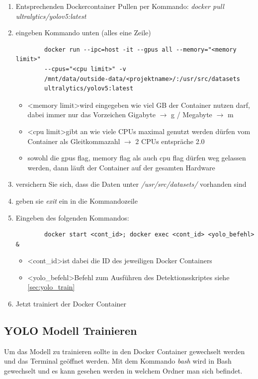 \begin{enumerate}
    \item Entsprechenden Dockercontainer Pullen per Kommando: \textit{docker pull ultralytics/yolov5:latest} 
    \item eingeben Kommando unten (alles eine Zeile)
    \begin{verbatim}
        docker run --ipc=host -it --gpus all --memory="<memory limit>"
        --cpus="<cpu limit>" -v 
        /mnt/data/outside-data/<projektname>/:/usr/src/datasets
        ultralytics/yolov5:latest
    \end{verbatim}
    \begin{itemize}
        \item \textless memory limit\textgreater  wird eingegeben wie viel GB der Container nutzen darf, dabei immer nur das Vorzeichen Gigabyte  $\rightarrow$ g / Megabyte $\rightarrow$ m
        \item \textless cpu limit\textgreater gibt an wie viele CPUs maximal genutzt werden dürfen vom Container als Gleitkommazahl $\rightarrow$ 2 CPUs entspräche 2.0
        \item sowohl die gpus flag, memory flag als auch cpu flag dürfen weg gelassen werden, dann läuft der Container auf der gesamten Hardware    
    \end{itemize}
    \item versichern Sie sich, dass die Daten unter \textit{/usr/src/datasets/} vorhanden sind
    \item geben sie \textit{exit} ein in die Kommandozeile 
    \item Eingeben des folgenden Kommandos:
    \begin{verbatim}
        docker start <cont_id>; docker exec <cont_id> <yolo_befehl> &
    \end{verbatim}
    \begin{itemize}
        \item  \textless cont\_id\textgreater  ist dabei die ID des jeweiligen Docker Containers
        \item \textless yolo\_befehl\textgreater  Befehl zum Ausführen des Detektionsskriptes siehe \autoref{sec:yolo_train}
    \end{itemize}
    \item Jetzt trainiert der Docker Container
\end{enumerate}

\subsection{YOLO Modell Trainieren}
\label{sec:yolo_train}
Um das Modell zu trainieren sollte in den Docker Container gewechselt werden und das Terminal geöffnet werden. Mit dem Kommando \textit{bash} wird in Bash gewechselt und es kann gesehen werden in welchem Ordner man sich befindet. 

